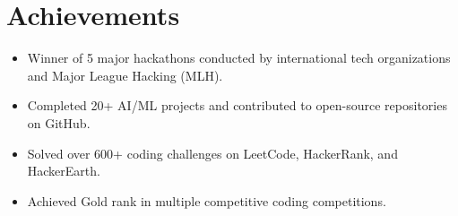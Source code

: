 \documentclass[letterpaper,11pt]{article}
\newcommand{\resumeItem}[1]{
  \item\small{{#1 \vspace{-2pt}}}
}
\newcommand{\resumeSubHeadingListStart}{\begin{itemize}[leftmargin=0.15in, label={}]}
\newcommand{\resumeSubHeadingListEnd}{\end{itemize}}
\begin{document}
\section{Achievements}
  \resumeSubHeadingListStart
    \resumeItem{Winner of 5 major hackathons conducted by international tech organizations and Major League Hacking (MLH).}
    \resumeItem{Completed 20+ AI/ML projects and contributed to open-source repositories on GitHub.}
    \resumeItem{Solved over 600+ coding challenges on LeetCode, HackerRank, and HackerEarth.}
    \resumeItem{Achieved Gold rank in multiple competitive coding competitions.}
  \resumeSubHeadingListEnd

\end{document}
